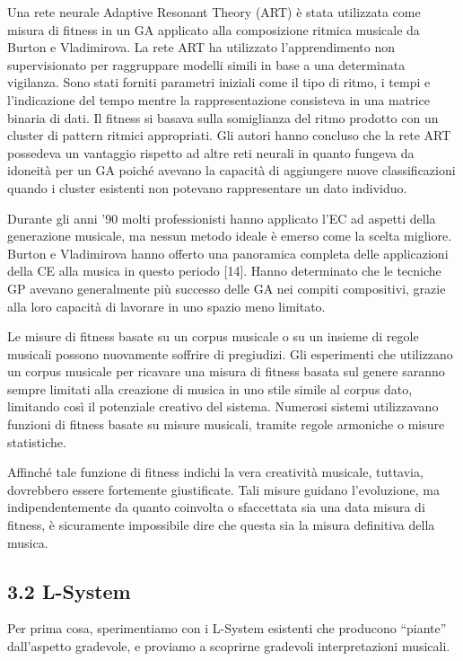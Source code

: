 \documentclass[a4paper,12pt]{report}
\begin{document}
Una rete neurale Adaptive Resonant Theory (ART) è stata utilizzata come misura di fitness in un GA applicato alla composizione ritmica musicale da Burton e Vladimirova. La rete ART ha utilizzato l’apprendimento non supervisionato per raggruppare modelli simili in base a una determinata vigilanza. 
Sono stati forniti parametri iniziali come il tipo di ritmo, i tempi e l'indicazione del tempo mentre la rappresentazione consisteva in una matrice binaria di dati. Il fitness si basava sulla somiglianza del ritmo prodotto con un cluster di pattern ritmici appropriati. Gli autori hanno concluso che la rete ART possedeva un vantaggio rispetto ad altre reti neurali in quanto fungeva da idoneità per un GA poiché avevano la capacità di aggiungere nuove classificazioni quando i cluster esistenti non potevano rappresentare un dato individuo.

Durante gli anni ’90 molti professionisti hanno applicato l’EC ad aspetti della generazione musicale, ma nessun metodo ideale è emerso come la scelta migliore. Burton e Vladimirova hanno offerto una panoramica completa delle applicazioni della CE alla musica in questo periodo [14]. Hanno determinato che le tecniche GP avevano generalmente più successo delle GA nei compiti compositivi, grazie alla loro capacità di lavorare in uno spazio meno limitato.

Le misure di fitness basate su un corpus musicale o su un insieme di regole musicali possono nuovamente soffrire di pregiudizi. Gli esperimenti che utilizzano un corpus musicale per ricavare una misura di fitness basata sul genere saranno sempre limitati alla creazione di musica in uno stile simile al corpus dato, limitando così il potenziale creativo del sistema. Numerosi sistemi utilizzavano funzioni di fitness basate su misure musicali, tramite regole armoniche o misure statistiche. 

Affinché tale funzione di fitness indichi la vera creatività musicale, tuttavia, dovrebbero essere fortemente giustificate. Tali misure guidano l’evoluzione, ma indipendentemente da quanto coinvolta o sfaccettata sia una data misura di fitness, è sicuramente impossibile dire che questa sia la misura definitiva della musica.

\subsection*{3.2 L-System}

Per prima cosa, sperimentiamo con i L-System esistenti che producono “piante” dall’aspetto gradevole, e proviamo a scoprirne gradevoli interpretazioni musicali.
\end{document}
